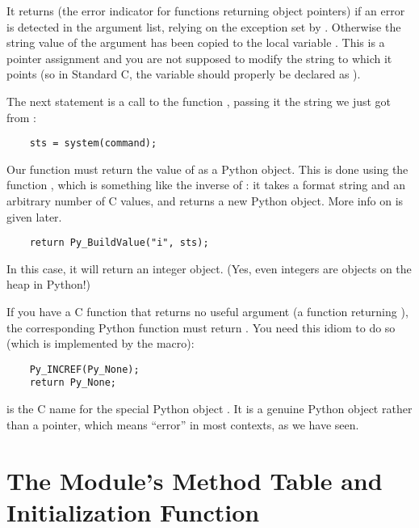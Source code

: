 It returns \NULL{} (the error indicator for functions returning
object pointers) if an error is detected in the argument list, relying
on the exception set by .  Otherwise the
string value of the argument has been copied to the local variable
.  This is a pointer assignment and you are not supposed
to modify the string to which it points (so in Standard C, the variable
 should properly be declared as ).

The next statement is a call to the \UNIX{} function
, passing it the string we just got from
:

\begin{verbatim}
    sts = system(command);
\end{verbatim}

Our  function must return the value of
 as a Python object.  This is done using the function
, which is something like the inverse of
: it takes a format string and an
arbitrary number of C values, and returns a new Python object.
More info on  is given later.

\begin{verbatim}
    return Py_BuildValue("i", sts);
\end{verbatim}

In this case, it will return an integer object.  (Yes, even integers
are objects on the heap in Python!)

If you have a C function that returns no useful argument (a function
returning ), the corresponding Python function must return
.   You need this idiom to do so (which is implemented by the
 macro):

\begin{verbatim}
    Py_INCREF(Py_None);
    return Py_None;
\end{verbatim}

 is the C name for the special Python object
.  It is a genuine Python object rather than a \NULL{}
pointer, which means ``error'' in most contexts, as we have seen.


\section{The Module's Method Table and Initialization Function
         \label{methodTable}}

